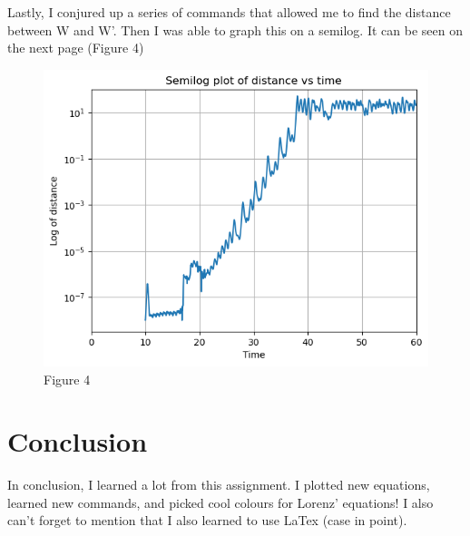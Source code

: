 \documentclass{article}
\begin{document}
Lastly, I conjured up a series of commands that allowed me to find the distance between W and W'.
Then I was able to graph this on a semilog. It can be seen on the next page (Figure 4)
\begin{figure}

\includegraphics[width=.6\linewidth,height=280\texthheight]{Semilog.png} 
\caption{Figure 4}
\label{fig:wrapfig}
\end{figure}

\section{Conclusion}
In conclusion, I learned a lot from this assignment. I plotted new equations, learned new commands, and picked cool colours for Lorenz' equations!
I also can't forget to mention that I also learned to use LaTex (case in point).
\end{document}
